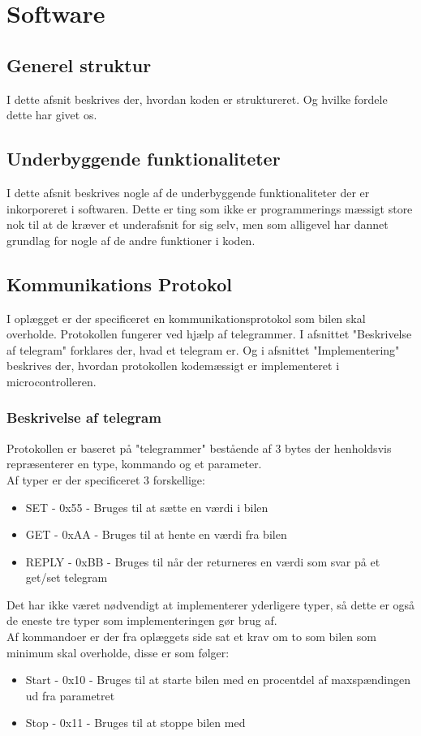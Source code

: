 \section{Software}

\subsection{Generel struktur}
I dette afsnit beskrives der, hvordan koden er struktureret. Og hvilke fordele dette har givet os.

\subsection{Underbyggende funktionaliteter}
I dette afsnit beskrives nogle af de underbyggende funktionaliteter der er inkorporeret i softwaren. Dette er ting som ikke er programmerings mæssigt store nok til at de kræver et underafsnit for sig selv, men som alligevel har dannet grundlag for nogle af de andre funktioner i koden.

\subsection{Kommunikations Protokol}
I oplægget er der specificeret en kommunikationsprotokol som bilen skal overholde. Protokollen fungerer ved hjælp af telegrammer. I afsnittet "Beskrivelse af telegram" forklares der, hvad et telegram er. Og i afsnittet "Implementering" beskrives der, hvordan protokollen kodemæssigt er implementeret i microcontrolleren.

\subsubsection{Beskrivelse af telegram}
Protokollen er baseret på "telegrammer" bestående af 3 bytes der henholdsvis repræsenterer en type, kommando og et parameter.\\
Af typer er der specificeret 3 forskellige:
\begin{itemize}
	\item SET - 0x55 - Bruges til at sætte en værdi i bilen
	\item GET - 0xAA - Bruges til at hente en værdi fra bilen
	\item REPLY - 0xBB - Bruges til når der returneres en værdi som svar på et get/set telegram
\end{itemize}
Det har ikke været nødvendigt at implementerer yderligere typer, så dette er også de eneste tre typer som implementeringen gør brug af.\\
Af kommandoer er der fra oplæggets side sat et krav om to som bilen som minimum skal overholde, disse er som følger:
\begin{itemize}
	\item Start - 0x10 - Bruges til at starte bilen med en procentdel af maxspændingen ud 			fra parametret
	\item Stop - 0x11 - Bruges til at stoppe bilen med
\end{itemize}

